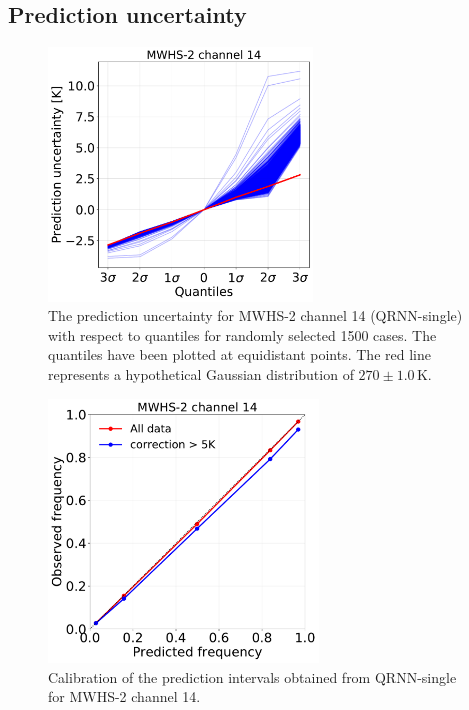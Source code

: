 \documentclass[amt, manuscript]{copernicus}
\begin{document}
\subsection{Prediction uncertainty}
\label{sec:uncertainty_mwhs}
\begin{figure}[t]
	\includegraphics[width = 70mm]{Figures/prediction_uncertainty_MWHS_14.pdf}	
	\caption{The prediction uncertainty for MWHS-2 channel 14 (QRNN-single) with respect to quantiles for randomly selected 1500 cases. The quantiles have been plotted at equidistant points. The red line represents a hypothetical Gaussian distribution of $270\pm1.0$\,K.}
	\label{fig:prediction_uncertainty_mwhs}	
\end{figure}
\begin{figure}[t]
	\includegraphics[height = 70mm]{Figures/calibration_QRNN_MWHS_14.pdf}	
	\caption{Calibration of the prediction intervals obtained from QRNN-single for MWHS-2 channel 14. }
	\label{fig:calibration_mwhs}	
\end{figure}
\end{document}
